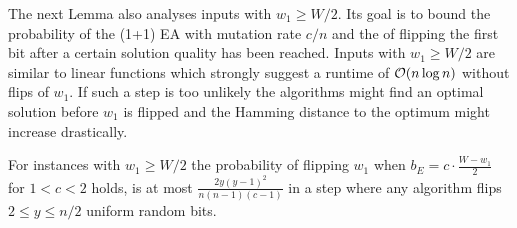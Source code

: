 The next Lemma also analyses inputs with $w_1\ge W/2$.
Its goal is to bound the probability of the (1+1) EA with mutation rate $c/n$ and the \RLSR[k\ge2] of flipping the first bit after a certain solution quality has been reached.
Inputs with $w_1\ge W/2$ are similar to linear functions which strongly suggest a runtime of $\mathcal{O}(n\log{n})$ without flips of $w_1$.
If such a step is too unlikely the algorithms might find an optimal solution before $w_1$ is flipped and the Hamming distance to the optimum might increase drastically.

\begin{lemma}\label{lemma:W1FlipWontHappen}
    For instances with $w_1\ge W/2$ the probability of flipping $w_1$ when $b_E = c\cdot\frac{W-w_1}{2}$ for $1<c<2$ holds, is at most \(\frac{2y{(y-1)}^2}{n(n-1)(c-1)}\) in a step where any algorithm flips $2\le y\le n/2$ uniform random bits.
\end{lemma}
